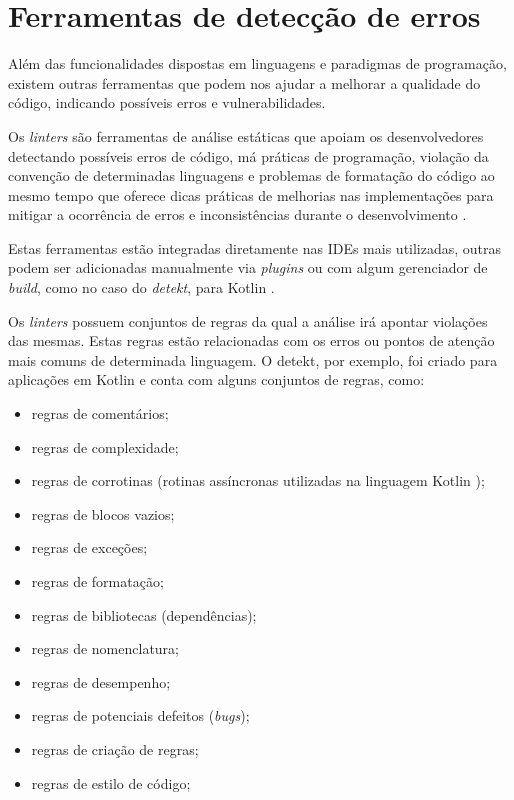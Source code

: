 \chapter{Ferramentas de detecção de erros}\label{cap:linters}

 Além das funcionalidades dispostas em linguagens e paradigmas de programação, existem outras ferramentas que podem nos ajudar a melhorar a qualidade do código, indicando possíveis erros e vulnerabilidades.
 
 Os \textit{linters} são ferramentas de análise estáticas que apoiam os desenvolvedores detectando possíveis erros de código, má práticas de programação, violação da convenção de determinadas linguagens e problemas de formatação do código ao mesmo tempo que oferece dicas práticas de melhorias nas implementações para mitigar a ocorrência de erros e inconsistências durante o desenvolvimento \cite{analysing_linter_usage_and_warning}.

Estas ferramentas estão integradas diretamente nas IDEs mais utilizadas, outras podem ser adicionadas manualmente via \textit{plugins} ou com algum gerenciador de \textit{build}, como no caso do \textit{detekt}, para Kotlin \cite{detekt_gettint_stated_gradle}.

Os \textit{linters} possuem conjuntos de regras da qual a análise irá apontar violações das mesmas. Estas regras estão relacionadas com os erros ou pontos de atenção mais comuns de determinada linguagem. O detekt, por exemplo, foi criado para aplicações em Kotlin e conta com alguns conjuntos de regras, como:

\begin{itemize}
    \item regras de comentários;
    \item regras de complexidade;
    \item regras de corrotinas (rotinas assíncronas utilizadas na linguagem Kotlin \cite{kotlin_coroutines});
    \item regras de blocos vazios;
    \item regras de exceções;
    \item regras de formatação;
    \item regras de bibliotecas (dependências);
    \item regras de nomenclatura;
    \item regras de desempenho;
    \item regras de potenciais defeitos (\textit{bugs});
    \item regras de criação de regras;
    \item regras de estilo de código;
\end{itemize}

